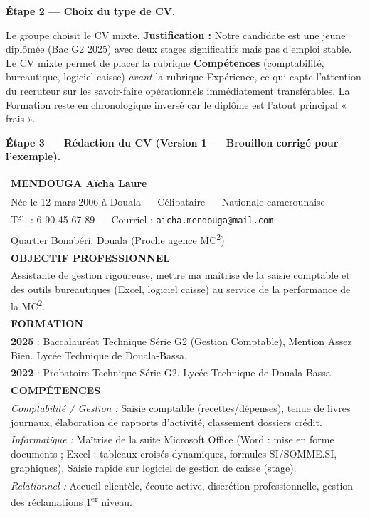 \documentclass[11pt]{article}
\newcommand{\cle}[1]{{\popxbold\color{popdark}#1}}
\begin{document}
\begin{exoresolu}
\textbf{Étape 2 — Choix du type de CV.}

Le groupe choisit le \cle{CV mixte}. 
\textbf{Justification :} Notre candidate est une jeune diplômée (Bac G2 2025) avec deux stages significatifs mais pas d'emploi stable. Le CV mixte permet de placer la rubrique \textbf{Compétences} (comptabilité, bureautique, logiciel caisse) \emph{avant} la rubrique Expérience, ce qui capte l'attention du recruteur sur les savoir-faire opérationnels immédiatement transférables. La Formation reste en chronologique inversé car le diplôme est l'atout principal « frais ».

\textbf{Étape 3 — Rédaction du CV (Version 1 — Brouillon corrigé pour l'exemple).}

\begin{center}
\begin{tabularx}{\linewidth}{|X|}\hline
\rowcolor{popgreenL} \textbf{MENDOUGA Aïcha Laure} \\ \hline
Née le 12 mars 2006 à Douala — Célibataire — Nationale camerounaise \\
Tél. : 6 90 45 67 89 — Courriel : \texttt{aicha.mendouga@mail.com} \\
Quartier Bonabéri, Douala (Proche agence MC\textsuperscript{2}) \\ \hline
\textbf{OBJECTIF PROFESSIONNEL} \\
Assistante de gestion rigoureuse, mettre ma maîtrise de la saisie comptable et des outils bureautiques (Excel, logiciel caisse) au service de la performance de la MC\textsuperscript{2}. \\ \hline
\textbf{FORMATION} \\
\textbf{2025} : Baccalauréat Technique Série G2 (Gestion Comptable), Mention Assez Bien. Lycée Technique de Douala-Bassa. \\
\textbf{2022} : Probatoire Technique Série G2. Lycée Technique de Douala-Bassa. \\ \hline
\textbf{COMPÉTENCES} \\
\textit{Comptabilité / Gestion :} Saisie comptable (recettes/dépenses), tenue de livres journaux, élaboration de rapports d'activité, classement dossiers crédit. \\
\textit{Informatique :} Maîtrise de la suite Microsoft Office (Word : mise en forme documents ; Excel : tableaux croisés dynamiques, formules SI/SOMME.SI, graphiques), Saisie rapide sur logiciel de gestion de caisse (stage). \\
\textit{Relationnel :} Accueil clientèle, écoute active, discrétion professionnelle, gestion des réclamations 1\textsuperscript{er} niveau. \\ \hline

\end{tabularx}
\end{center}
\end{exoresolu}
\end{document}
